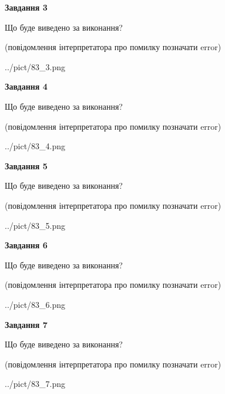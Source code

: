 \documentclass[12pt, ukrainian]{article}
\begin{document}
{\begin {large}
{\begin {center}\textbf{Завдання 3}\end {center}}\par
Що буде виведено за виконання?\par
 (повідомлення інтерпретатора про помилку позначати error)\par
\begin{center}
	{../pict/83_3.png}
\end{center}
\newpage

{\begin {center}\textbf{Завдання 4}\end {center}}\par
Що буде виведено за виконання?\par
 (повідомлення інтерпретатора про помилку позначати error)\par
\begin{center}
	{../pict/83_4.png}
\end{center}
\newpage

{\begin {center}\textbf{Завдання 5}\end {center}}\par
Що буде виведено за виконання?\par
 (повідомлення інтерпретатора про помилку позначати error)\par
\begin{center}
	{../pict/83_5.png}
\end{center}
\newpage

{\begin {center}\textbf{Завдання 6}\end {center}}\par
Що буде виведено за виконання?\par
 (повідомлення інтерпретатора про помилку позначати error)\par
\begin{center}
	{../pict/83_6.png}
\end{center}
\newpage

{\begin {center}\textbf{Завдання 7}\end {center}}\par
Що буде виведено за виконання?\par
 (повідомлення інтерпретатора про помилку позначати error)\par
\begin{center}
	{../pict/83_7.png}
\end{center}
\newpage


\end{large}}
\end{document}
